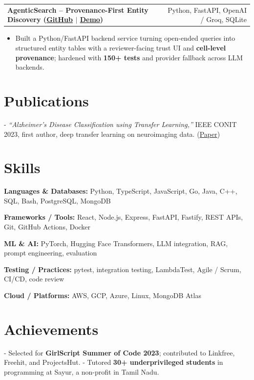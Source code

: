 \documentclass[letterpaper,11pt]{article}
\makeatletter
\newcommand{\projItem}[2]{%
  \vspace{6pt}
  \begin{tabular*}{\textwidth}{@{}l@{\extracolsep{\fill}}r@{}}
    \textbf{#1} & #2 \\
  \end{tabular*}\par\vspace{-2pt}
}
\newcommand{\skillLine}[2]{\textbf{#1:} #2\par\vspace{2pt}}
\newcommand{\inlineBlock}[1]{{\setlength{\leftskip}{0.18in}\small #1\par}}
\makeatother
\begin{document}
\projItem{AgenticSearch -- Provenance-First Entity Discovery {\normalfont\small(\href{https://github.com/Deva-1903/ciir_agentic_search}{GitHub} $\vert$ \href{https://agentic-search-negglszkwa-uc.a.run.app}{Demo})}}{Python, FastAPI, OpenAI / Groq, SQLite}
\begin{itemize}
  \item Built a Python/FastAPI backend service turning open-ended queries into structured entity tables with a reviewer-facing trust UI and \textbf{cell-level provenance}; hardened with \textbf{150+ tests} and provider fallback across LLM backends.
\end{itemize}

\section{Publications}
\inlineBlock{- \textit{``Alzheimer's Disease Classification using Transfer Learning,''} IEEE CONIT 2023, first author, deep transfer learning on neuroimaging data. {\normalfont\small(\href{https://ieeexplore.ieee.org/document/10205760}{Paper})}}

\section{Skills}
\skillLine{Languages \& Databases}{Python, TypeScript, JavaScript, Go, Java, C++, SQL, Bash, PostgreSQL, MongoDB}
\skillLine{Frameworks / Tools}{React, Node.js, Express, FastAPI, Fastify, REST APIs, Git, GitHub Actions, Docker}
\skillLine{ML \& AI}{PyTorch, Hugging Face Transformers, LLM integration, RAG, prompt engineering, evaluation}
\skillLine{Testing / Practices}{pytest, integration testing, LambdaTest, Agile / Scrum, CI/CD, code review}
\skillLine{Cloud / Platforms}{AWS, GCP, Azure, Linux, MongoDB Atlas}

\section{Achievements}
\inlineBlock{- Selected for \textbf{GirlScript Summer of Code 2023}; contributed to Linkfree, Freehit, and ProjectsHut. - Tutored \textbf{30+ underprivileged students} in programming at Sayur, a non-profit in Tamil Nadu.}
\end{document}
